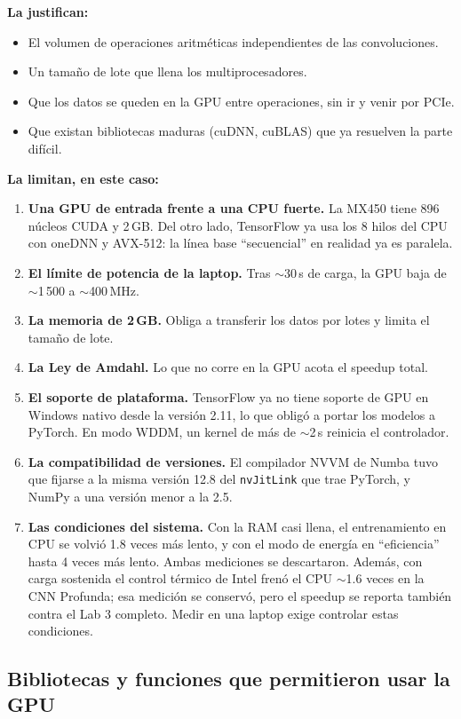 \documentclass[11pt,letterpaper]{article}
\newcommand{\cod}[1]{\texttt{#1}}
\begin{document}
\textbf{La justifican:}
\begin{itemize}
  \item El volumen de operaciones aritméticas independientes de las convoluciones.
  \item Un tamaño de lote que llena los multiprocesadores.
  \item Que los datos se queden en la GPU entre operaciones, sin ir y venir por PCIe.
  \item Que existan bibliotecas maduras (cuDNN, cuBLAS) que ya resuelven la parte difícil.
\end{itemize}

\textbf{La limitan, en este caso:}
\begin{enumerate}
  \item \textbf{Una GPU de entrada frente a una CPU fuerte.} La MX450 tiene 896 núcleos CUDA y 2\,GB. Del otro lado, TensorFlow ya usa los 8 hilos del CPU con oneDNN y AVX-512: la línea base ``secuencial'' en realidad ya es paralela.
  \item \textbf{El límite de potencia de la laptop.} Tras $\sim$30\,s de carga, la GPU baja de $\sim$1\,500 a $\sim$400\,MHz.
  \item \textbf{La memoria de 2\,GB.} Obliga a transferir los datos por lotes y limita el tamaño de lote.
  \item \textbf{La Ley de Amdahl.} Lo que no corre en la GPU acota el speedup total.
  \item \textbf{El soporte de plataforma.} TensorFlow ya no tiene soporte de GPU en Windows nativo desde la versión 2.11, lo que obligó a portar los modelos a PyTorch. En modo WDDM, un kernel de más de $\sim$2\,s reinicia el controlador.
  \item \textbf{La compatibilidad de versiones.} El compilador NVVM de Numba tuvo que fijarse a la misma versión 12.8 del \cod{nvJitLink} que trae PyTorch, y NumPy a una versión menor a la 2.5.
  \item \textbf{Las condiciones del sistema.} Con la RAM casi llena, el entrenamiento en CPU se volvió 1.8 veces más lento, y con el modo de energía en ``eficiencia'' hasta 4 veces más lento. Ambas mediciones se descartaron. Además, con carga sostenida el control térmico de Intel frenó el CPU $\sim$1.6 veces en la CNN Profunda; esa medición se conservó, pero el speedup se reporta también contra el Lab 3 completo. Medir en una laptop exige controlar estas condiciones.
\end{enumerate}

\subsection*{Bibliotecas y funciones que permitieron usar la GPU}
\end{document}
